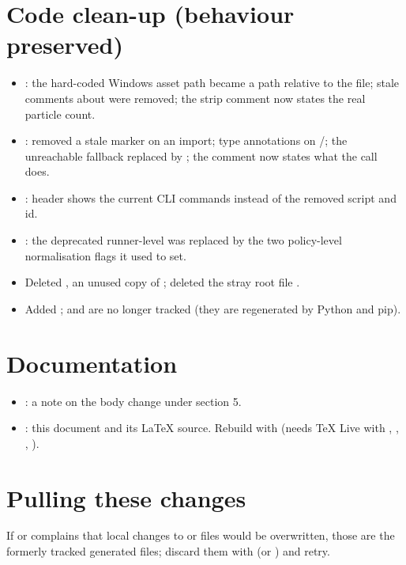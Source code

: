 \section*{Code clean-up (behaviour preserved)}
\begin{itemize}[leftmargin=1.6em]
  \item {}: the hard-coded Windows asset path became
    a path relative to the file; stale comments about 
    were removed; the strip comment now states the real particle count.
  \item {}: removed a stale  marker on an
    import; type annotations on /; the
    unreachable  fallback replaced by ;
    the  comment now states what the call does.
  \item {}: header shows the current CLI commands
    instead of the removed  script and  id.
  \item {}: the deprecated runner-level
     was replaced by the two policy-level
    normalisation flags it used to set.
  \item Deleted , an unused copy of
    ; deleted the stray root file
    .
  \item Added ;  and
     are no longer tracked (they are
    regenerated by Python and pip).
\end{itemize}

\section*{Documentation}
\begin{itemize}[leftmargin=1.6em]
  \item {}: a note on the body change under section 5.
  \item {}: this document and its LaTeX source.
    Rebuild with  (needs TeX Live with ,
    , , ).
\end{itemize}

\section*{Pulling these changes}
If  or  complains that local changes to
 or  files would be overwritten, those are the
formerly tracked generated files; discard them with 
(or ) and retry.

